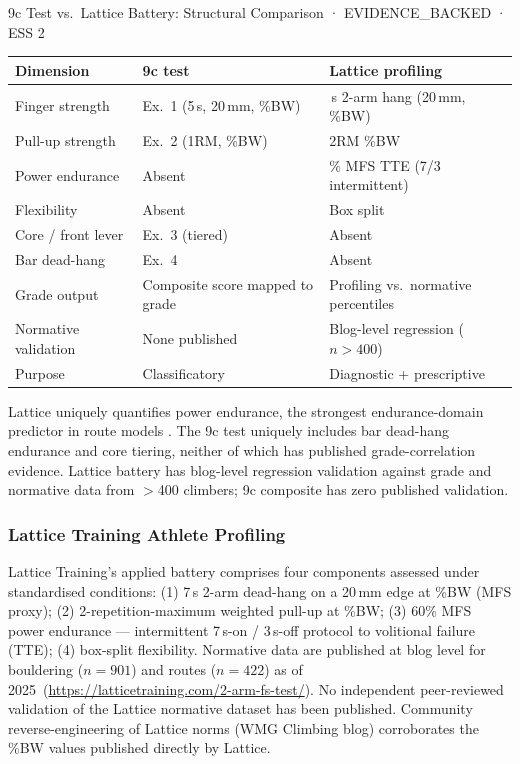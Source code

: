 \begin{evidencebox}{9c Test vs.\ Lattice Battery: Structural Comparison · EVIDENCE\_BACKED · ESS 2}
\begin{tabular}{>{\raggedright}p{4.0cm}>{\raggedright}p{4.0cm}>{\raggedright\arraybackslash}p{4.5cm}}
\toprule
\textbf{Dimension} & \textbf{9c test} & \textbf{Lattice profiling} \\
\midrule
Finger strength & Ex.\ 1 (5\,s, 20\,mm, \%BW) & 7\,s 2-arm hang (20\,mm, \%BW) \\
Pull-up strength & Ex.\ 2 (1RM, \%BW) & 2RM \%BW \\
Power endurance & Absent & 60\% MFS TTE (7/3 intermittent) \\
Flexibility & Absent & Box split \\
Core / front lever & Ex.\ 3 (tiered) & Absent \\
Bar dead-hang & Ex.\ 4 & Absent \\
Grade output & Composite score mapped to grade & Profiling vs.\ normative percentiles \\
Normative validation & None published & Blog-level regression ($n > 400$) \\
Purpose & Classificatory & Diagnostic + prescriptive \\
\bottomrule
\end{tabular}

\medskip
\noindent Lattice uniquely quantifies power endurance, the strongest endurance-domain predictor in route models \cite{TEMP_Saeterbakken2023}. The 9c test uniquely includes bar dead-hang endurance and core tiering, neither of which has published grade-correlation evidence. Lattice battery has blog-level regression validation against grade and normative data from $>$400 climbers; 9c composite has zero published validation.
\end{evidencebox}

\subsubsection{Lattice Training Athlete Profiling}

Lattice Training's applied battery comprises four components assessed under standardised conditions: (1) 7\,s 2-arm dead-hang on a 20\,mm edge at \%BW (MFS proxy); (2) 2-repetition-maximum weighted pull-up at \%BW; (3) 60\% MFS power endurance --- intermittent 7\,s-on / 3\,s-off protocol to volitional failure (TTE); (4) box-split flexibility. Normative data are published at blog level for bouldering ($n = 901$) and routes ($n = 422$) as of 2025\singlesource\ (\url{https://latticetraining.com/2-arm-fs-test/}). No independent peer-reviewed validation of the Lattice normative dataset has been published. Community reverse-engineering of Lattice norms (WMG Climbing blog\singlesource) corroborates the \%BW values published directly by Lattice.

